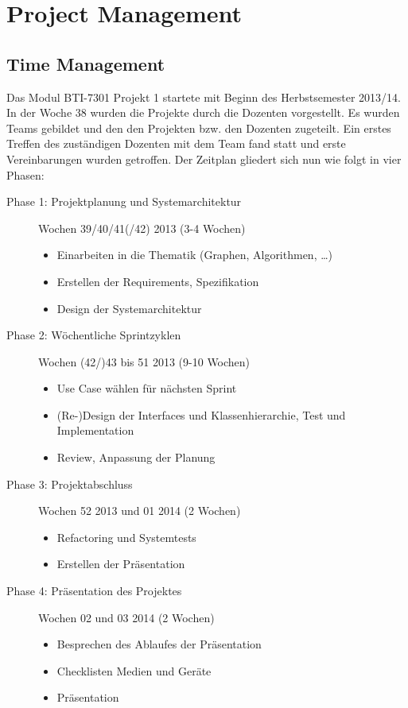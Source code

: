 \newpage		%
\mbox{} 		%
\thispagestyle{empty} 	%
\chapter{Project Management}
% 
\section{Time Management}
\label{sec:Time Management}
Das Modul BTI-7301 Projekt 1 startete mit Beginn des Herbstsemester 2013/14. In der Woche 38 wurden die Projekte durch die Dozenten vorgestellt. Es wurden Teams gebildet und den den Projekten bzw. den Dozenten zugeteilt. Ein erstes Treffen des zust\"andigen Dozenten mit dem Team fand statt und erste Vereinbarungen wurden getroffen. Der Zeitplan gliedert sich nun wie folgt in vier Phasen:
\begin{description}
  \item[Phase 1: Projektplanung und Systemarchitektur] Wochen 39/40/41(/42) 2013 (3-4 Wochen)
  \begin{itemize}
    \item Einarbeiten in die Thematik (Graphen, Algorithmen, \dots)
    \item Erstellen der Requirements, Spezifikation
    \item Design der Systemarchitektur
  \end{itemize}
  \item[Phase 2: W\"ochentliche Sprintzyklen] Wochen (42/)43 bis 51 2013 (9-10 Wochen)
  \begin{itemize}
    \item Use Case w\"ahlen f\"ur n\"achsten Sprint
    \item (Re-)Design der Interfaces und Klassenhierarchie, Test und Implementation
    \item Review, Anpassung der Planung
  \end{itemize}
  \item[Phase 3: Projektabschluss] Wochen 52 2013 und 01 2014 (2 Wochen)
  \begin{itemize}
    \item Refactoring und Systemtests
    \item Erstellen der Pr\"asentation
  \end{itemize}
  \item[Phase 4: Pr\"asentation des Projektes] Wochen 02 und 03 2014 (2 Wochen)
  \begin{itemize}
    \item Besprechen des Ablaufes der Pr\"asentation
    \item Checklisten Medien und Ger\"ate
    \item Pr\"asentation
  \end{itemize}
\end{description}
% 
